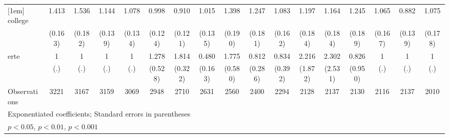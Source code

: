{\begin{tabular}{l*{16}{c}}
[1em]
college             &       1.413\sym{**} &       1.536\sym{***}&       1.144         &       1.078         &       0.998         &       0.910         &       1.015         &       1.398\sym{*}  &       1.247         &       1.083         &       1.197         &       1.164         &       1.245         &       1.065         &       0.882         &       1.075         \\
                    &     (0.163)         &     (0.182)         &     (0.139)         &     (0.134)         &     (0.124)         &     (0.121)         &     (0.135)         &     (0.190)         &     (0.181)         &     (0.162)         &     (0.184)         &     (0.184)         &     (0.189)         &     (0.167)         &     (0.139)         &     (0.178)         \\
[1em]
erte                &           1         &           1         &           1         &           1         &       1.278         &       1.814\sym{***}&       0.480\sym{*}  &       1.775         &       0.812         &       0.834         &       2.216         &       2.302         &       0.826         &           1         &           1         &           1         \\
                    &         (.)         &         (.)         &         (.)         &         (.)         &     (0.528)         &     (0.322)         &     (0.163)         &     (0.580)         &     (0.286)         &     (0.392)         &     (1.872)         &     (2.531)         &     (0.950)         &         (.)         &         (.)         &         (.)         \\
\hline
Observations        &        3221         &        3167         &        3159         &        3069         &        2948         &        2710         &        2631         &        2560         &        2400         &        2294         &        2128         &        2137         &        2130         &        2116         &        2137         &        2010         \\
\hline\hline
\multicolumn{17}{l}{\footnotesize Exponentiated coefficients; Standard errors in parentheses}\\
\multicolumn{17}{l}{\footnotesize \sym{*} \(p<0.05\), \sym{**} \(p<0.01\), \sym{***} \(p<0.001\)}\\
\end{tabular}
}
